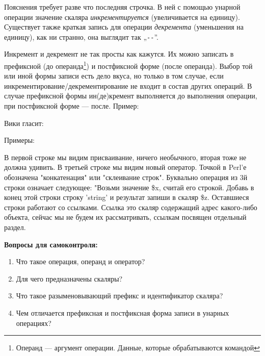 Пояснения требует разве что последняя строчка. В ней с помощью унарной 
операции значение скаляра \emph{инкрементируется} (увеличивается на 
единицу). Существует также краткая запись для операции \emph{декремента} 
(уменьшения на единицу), как ни странно, она выглядит так „\texttt{-\--}”.

Инкремент и декремент не так просты как кажутся. Их можно записать в 
префиксной (до операнда\footnote{Операнд --- аргумент операции. Данные, которые 
обрабатываются командой}) и постфиксной форме (после операнда). Выбор той 
или иной формы записи есть дело вкуса, но только в том случае, если 
инкрементирование/декрементирование не входит в состав других операций. 
В случае префиксной формы ин(де)кремент выполняется до выполнения 
операции, при постфиксной форме --- после. Пример:


Вики гласит: 

Примеры:


В первой строке мы видим присваивание, ничего необычного, вторая тоже не должна
удивить. В третьей строке мы видим новый оператор. Точкой в Perl'е обозначена
"конкатенация" или "склеивание строк". Буквально операция из 3й строки означает
следующее: "Возьми значение \$x, считай его строкой. Добавь в конец этой строки
строку 'string' и результат запиши в скаляр \$z.
Оставшиеся строки работают со ссылками. Ссылка это скаляр содержащий адрес
какого-либо объекта, сейчас мы не будем их рассматривать, ссылкам посвящен отдельный
раздел.

{\large{\textbf{Вопросы для самоконтроля:}}}

\begin{enumerate}
\item Что такое операция, операнд и оператор?
\item Для чего предназначены скаляры?
\item Что такое разыменовывающий префикс и идентификатор скаляра?
\item Чем отличается префиксная и постфиксная форма записи в унарных
операциях?
\end{enumerate}

